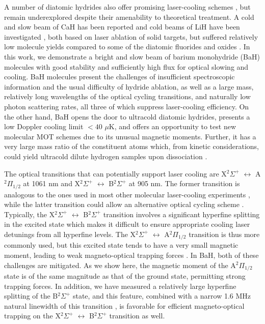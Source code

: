 \documentclass[amsmath,amssymb,aps,twocolumn,longbibliography,notitlepage]{revtex4-1}
\begin{document}
A number of diatomic hydrides also offer promising laser-cooling schemes \cite{DiRosaEPJD04_LaserCoolingMolecules,LanePRA15_HFromBaH}, but remain underexplored despite their amenability to theoretical treatment.  A cold and slow beam of CaH has been reported \cite{DoyleLuPCCP11_SlowCaHBeam} and cold beams of LiH have been investigated \cite{TarbuttTokunagaJCP07_LiHSupersonicBeam}, both based on laser ablation of solid targets, but suffered relatively low molecule yields compared to some of the diatomic fluorides and oxides \cite{DoyleHutzlerCR12_BufferGasBeams}.  In this work, we demonstrate a bright and slow beam of barium monohydride (BaH) molecules with good stability and sufficiently high flux for optical slowing and cooling.  BaH molecules present the challenges of insufficient spectroscopic information and the usual difficulty of hydride ablation, as well as a large mass, relatively long wavelengths of the optical cycling transitions, and naturally low photon scattering rates, all three of which suppress laser-cooling efficiency.  On the other hand, BaH opens the door to ultracold diatomic hydrides, presents a low Doppler cooling limit $<40$ $\mu$K, and offers an opportunity to test new molecular MOT schemes due to its unusual magnetic moments.  Further, it has a very large mass ratio of the constituent atoms which, from kinetic considerations, could yield ultracold dilute hydrogen samples upon dissociation \cite{LanePRA15_HFromBaH}.

The optical transitions that can potentially support laser cooling are X$^2\Sigma^+$ $\leftrightarrow$ A$^2\Pi_{1/2}$ at 1061 nm and X$^2\Sigma^+$ $\leftrightarrow$ B$^2\Sigma^+$ at 905 nm.  The former transition is analogous to the ones used in most other molecular laser-cooling experiments \cite{DeMilleShumanNature10_SrFLaserCooling,TarbuttTruppeArXiv17_CaFBelowDopplerLimit,YeHummonPRL13_YO_MOT}, while the latter transition could allow an alternative optical cycling scheme \cite{TarbuttTruppeArXiv17_CaFBelowDopplerLimit}.  Typically, the X$^2\Sigma^+$ $\leftrightarrow$ B$^2\Sigma^+$ transition involves a significant hyperfine splitting in the excited state which makes it difficult to ensure appropriate cooling laser detunings from all hyperfine levels.  The X$^2\Sigma^+$ $\leftrightarrow$ A$^2\Pi_{1/2}$ transition is thus more commonly used, but this excited state tends to have a very small magnetic moment, leading to weak magneto-optical trapping forces \cite{TarbuttNJP15_ComplexLevelMOT}.  In BaH, both of these challenges are mitigated.  As we show here, the magnetic moment of the A$^2\Pi_{1/2}$ state is of the same magnitude as that of the ground state, permitting strong trapping forces.  In addition, we have measured a relatively large hyperfine splitting of the B$^2\Sigma^+$ state, and this feature, combined with a narrow 1.6 MHz natural linewidth of this transition \cite{BergPS97_BaHLifetime}, is favorable for efficient magneto-optical trapping on the X$^2\Sigma^+$ $\leftrightarrow$ B$^2\Sigma^+$ transition as well.
\end{document}
